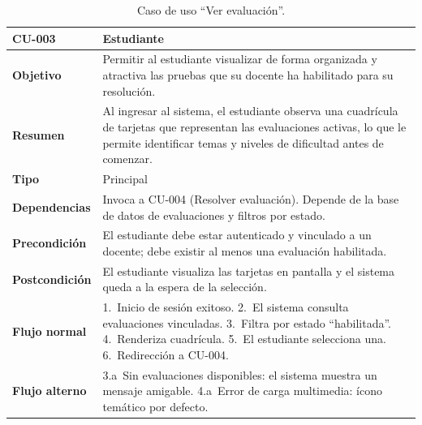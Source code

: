 \begin{table}[H]
\centering
\caption{Caso de uso ``Ver evaluación''.}
\label{tab:cu_ver_eval}
\begin{small}
\begin{tabularx}{\textwidth}{|L{3cm}|X|}
\hline
{}
 CU-003 &  Estudiante\\
\hline
\textbf{Objetivo} & Permitir al estudiante visualizar de forma organizada y atractiva las pruebas que su docente ha habilitado para su resolución.\\
\hline
\textbf{Resumen} & Al ingresar al sistema, el estudiante observa una cuadrícula de tarjetas que representan las evaluaciones activas, lo que le permite identificar temas y niveles de dificultad antes de comenzar.\\
\hline
\textbf{Tipo} & Principal\\
\hline
\textbf{Dependencias} & Invoca a CU-004 (Resolver evaluación). Depende de la base de datos de evaluaciones y filtros por estado.\\
\hline
\textbf{Precondición} & El estudiante debe estar autenticado y vinculado a un docente; debe existir al menos una evaluación habilitada.\\
\hline
\textbf{Postcondición} & El estudiante visualiza las tarjetas en pantalla y el sistema queda a la espera de la selección.\\
\hline
\textbf{Flujo normal} & 1.~Inicio de sesión exitoso. 2.~El sistema consulta evaluaciones vinculadas. 3.~Filtra por estado ``habilitada''. 4.~Renderiza cuadrícula. 5.~El estudiante selecciona una. 6.~Redirección a CU-004.\\
\hline
\textbf{Flujo alterno} & 3.a~Sin evaluaciones disponibles: el sistema muestra un mensaje amigable. 4.a~Error de carga multimedia: ícono temático por defecto.\\
\hline
\end{tabularx}
\end{small}
\fuenteautor
\end{table}

